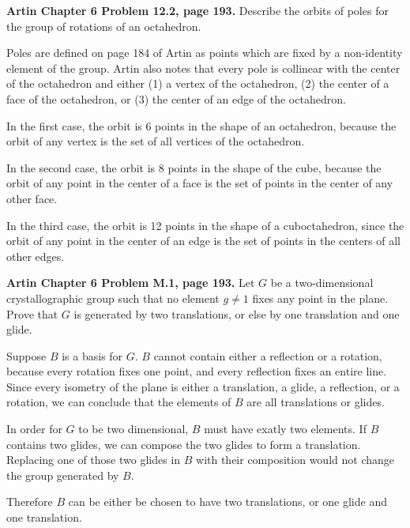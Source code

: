 \documentclass{article}
\begin{document}
\bigskip
\begin{prob}
    \textbf{Artin Chapter 6 Problem 12.2, page 193.} Describe the orbits of poles for the group of rotations of an octahedron.
\end{prob}
Poles are defined on page 184 of Artin as points which are fixed by a non-identity element of the group. Artin also notes that every pole is collinear with the center of the octahedron and either (1) a vertex of the octahedron, (2) the center of a face of the octahedron, or (3) the center of an edge of the octahedron.
\par
In the first case, the orbit is 6 points in the shape of an octahedron, because the orbit of any vertex is the set of all vertices of the octahedron.
\par
In the second case, the orbit is 8 points in the shape of the cube, because the orbit of any point in the center of a face is the set of points in the center of any other face.
\par
In the third case, the orbit is 12 points in the shape of a cuboctahedron, since the orbit of any point in the center of an edge is the set of points in the centers of all other edges.

\bigskip
\begin{prob}
    \textbf{Artin Chapter 6 Problem M.1, page 193.} Let $G$ be a two-dimensional crystallographic group such that no element $g \neq 1$ fixes any point in the plane. Prove that $G$ is generated by two translations, or else by one translation and one glide.
\end{prob}
Suppose $B$ is a basis for $G$. $B$ cannot contain either a reflection or a rotation, because every rotation fixes one point, and every reflection fixes an entire line. Since every isometry of the plane is either a translation, a glide, a reflection, or a rotation, we can conclude that the elements of $B$ are all translations or glides.
\par
In order for $G$ to be two dimensional, $B$ must have exatly two elements. If $B$ contains two glides, we can compose the two glides to form a translation. Replacing one of those two glides in $B$ with their composition would not change the group generated by $B$.
\par
Therefore $B$ can be either be chosen to have two translations, or one glide and one translation.
\end{document}

